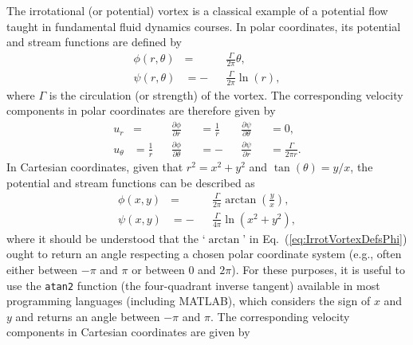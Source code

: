 \documentclass[10pt, twoside]{book}
\begin{document}
			The irrotational (or potential) vortex is a classical example of a potential flow taught in fundamental fluid dynamics courses. In polar coordinates, its potential and stream functions are defined by
			\begin{subequations}
			\label{eq:IrrotVortexDefsPolar}
				\begin{alignat}{2}
					\phi\left(r,\theta\right) &=  &&\frac{\Gamma}{2\pi}\theta,\label{eq:IrrotVortexDefsPolarPhi}\\
					\psi\left(r,\theta\right) &= -&&\frac{\Gamma}{2\pi}\ln\left(r\right),\label{eq:IrrotVortexDefsPolarPsi}
				\end{alignat}
			\end{subequations}
			where $\Gamma$ is the circulation (or strength) of the vortex. The corresponding velocity components in polar coordinates are therefore given by
			\begin{subequations}
			\label{eq:IrrotVortexVelPolar}
				\begin{alignat}{5}
					u_r &= &&\frac{\partial\phi}{\partial r} &&= \frac{1}{r}&&\frac{\partial\psi}{\partial \theta} &&= 0,\label{eq:IrrotVortexVelPolarUr}\\
					u_{\theta} &= \frac{1}{r}&&\frac{\partial\phi}{\partial \theta} &&= -&&\frac{\partial\psi}{\partial r} &&= \frac{\Gamma}{2\pi r}.\label{eq:IrrotVortexVelPolarUt}
				\end{alignat}
			\end{subequations}
			In Cartesian coordinates, given that $r^2 = x^2 + y^2$ and $\tan\left(\theta\right) = y/x$, the potential and stream functions can be described as
			\begin{subequations}
			\label{eq:IrrotVortexDefs}
				\begin{alignat}{2}
					\phi\left(x,y\right) &=  &&\frac{\Gamma}{2\pi}\arctan\left(\frac{y}{x}\right),\label{eq:IrrotVortexDefsPhi}\\
					\psi\left(x,y\right) &= -&&\frac{\Gamma}{4\pi}\ln\left(x^2 + y^2\right),\label{eq:IrrotVortexDefsPsi}
				\end{alignat}
			\end{subequations}
			where it should be understood that the `$\arctan$' in Eq.~(\ref{eq:IrrotVortexDefsPhi}) ought to return an angle respecting a chosen polar coordinate system (e.g., often either between $-\pi$ and $\pi$ or between $0$ and $2\pi$). For these purposes, it is useful to use the \texttt{atan2} function (the four-quadrant inverse tangent) available in most programming languages (including MATLAB), which considers the sign of $x$ and $y$ and returns an angle between $-\pi$ and $\pi$. The corresponding velocity components in Cartesian coordinates are given by
\end{document}
